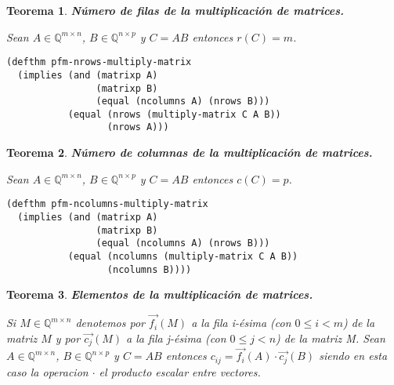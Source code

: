 \documentclass[a4paper,10pt]{article}
\newcommand{\M}[3]{#1 \in \mathbb{Q}^{#2 \times #3}}
\newtheorem{teor}{{Teorema}}
\begin{document}
\par \vspace{16pt}

\begin{teor} \textbf{Número de filas de la multiplicación de matrices.}\vspace{8pt}\par
Sean $\M{A}{m}{n}$, $\M{B}{n}{p}$ y $C = AB$  entonces $r(C) = m$.
\end{teor}

\begin{lstlisting}[language=clips]
(defthm pfm-nrows-multiply-matrix
  (implies (and (matrixp A)
                (matrixp B)
                (equal (ncolumns A) (nrows B)))
           (equal (nrows (multiply-matrix C A B))
                  (nrows A)))
\end{lstlisting}	

\par \vspace{16pt}

\begin{teor} \textbf{Número de columnas de la multiplicación de matrices.}\vspace{8pt}\par
Sean $\M{A}{m}{n}$, $\M{B}{n}{p}$ y $C = AB$  entonces $c(C) = p$.
\end{teor}

\begin{lstlisting}[language=clips]
(defthm pfm-ncolumns-multiply-matrix
  (implies (and (matrixp A)
                (matrixp B)
                (equal (ncolumns A) (nrows B)))
           (equal (ncolumns (multiply-matrix C A B))
                  (ncolumns B))))
\end{lstlisting}	

\par \vspace{16pt}

\begin{teor} \textbf{Elementos de la multiplicación de matrices.}\vspace{8pt}\par
Si $\M{M}{m}{n}$ denotemos por $\overrightarrow{f_i}(M)$ a la fila i-ésima (con $0 \leq i < m$) de la matriz $M$ y por $\overrightarrow{c_j}(M)$ a la fila j-ésima (con $0 \leq j < n$) de la matriz M. Sean $\M{A}{m}{n}$, $\M{B}{n}{p}$ y $C = AB$  entonces $c_{ij} = \overrightarrow{f_i}(A)\cdot\overrightarrow{c_j}(B)$ siendo en esta caso la operacion $\cdot$ el producto escalar entre vectores.
\end{teor}
\end{document}
